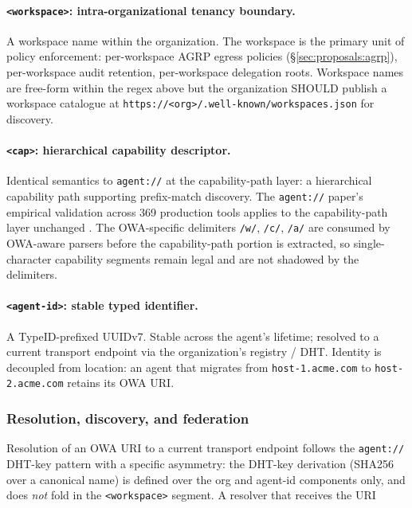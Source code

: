 \paragraph{\texttt{<workspace>}: intra-organizational tenancy boundary.}
A workspace name within the organization. The workspace
is the primary unit of policy enforcement: per-workspace
AGRP egress policies (\S\ref{sec:proposals:agrp}),
per-workspace audit retention, per-workspace
delegation roots. Workspace names are
free-form within the regex above but the organization
SHOULD publish a workspace catalogue at
\texttt{https://<org>/.well-known/workspaces.json} for
discovery.

\paragraph{\texttt{<cap>}: hierarchical capability descriptor.}
Identical semantics to \texttt{agent://} at the capability-path
layer: a hierarchical capability path supporting
prefix-match discovery. The \texttt{agent://} paper's
empirical validation across 369 production tools applies
to the capability-path layer unchanged
\cite{agent_uri_scheme}. The OWA-specific delimiters
\texttt{/w/}, \texttt{/c/}, \texttt{/a/} are consumed by
OWA-aware parsers before the capability-path portion is
extracted, so single-character capability segments remain
legal and are not shadowed by the delimiters.

\paragraph{\texttt{<agent-id>}: stable typed identifier.}
A TypeID-prefixed UUIDv7. Stable across the agent's
lifetime; resolved to a current transport endpoint via
the organization's registry / DHT. Identity is decoupled
from location: an agent that migrates from
\texttt{host-1.acme.com} to \texttt{host-2.acme.com}
retains its OWA URI.

\subsubsection{Resolution, discovery, and federation}
\label{sec:proposals:owa:resolution}

Resolution of an OWA URI to a current transport endpoint
follows the \texttt{agent://} DHT-key pattern with a
specific asymmetry: the DHT-key derivation
(SHA256 over a canonical name) is defined over the org
and agent-id components only, and does \emph{not} fold in
the \texttt{<workspace>} segment. A resolver that receives
the URI

